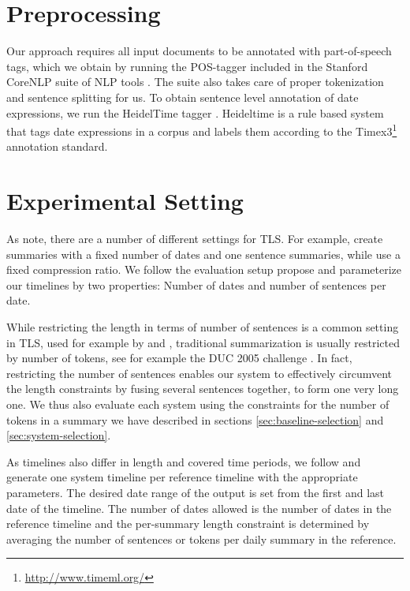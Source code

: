 \documentclass[a4paper,BCOR=10mm]{report}
\numberwithin{lemma}{chapter}
\numberwithin{definition}{chapter}
\begin{document}
\section{Preprocessing}

Our approach requires all input documents to be annotated with part-of-speech tags, which we obtain by running the POS-tagger included in the Stanford CoreNLP suite of NLP tools \citep{stanford-corenlp}. The suite also takes care of proper tokenization and sentence splitting for us.
To obtain sentence level annotation of date expressions, we run the HeidelTime tagger \citep{heideltime}. Heideltime is a rule based system that tags date expressions in a corpus and labels them according to the Timex3\footnote{\url{http://www.timeml.org/}} annotation standard.

\section{Experimental Setting} \label{sec:setup-settings}

As \citet{markert} note, there are a number of different settings for TLS.
For example, \citet{chieu} create summaries with a fixed number of dates and one sentence summaries, while \citet{yan-trans} use a fixed compression ratio.
We follow the evaluation setup \citeauthor{markert} propose and parameterize our timelines by two properties: Number of dates and number of sentences per date.

While restricting the length in terms of number of sentences is a common setting in TLS, used for example by \citet{chieu} and \citet{yan-trans}, traditional summarization is usually restricted by number of tokens, see for example the DUC 2005 challenge \citep{duc2005}. In fact, restricting the number of sentences enables our system to effectively circumvent the length constraints by fusing several sentences together, to form one very long one.
We thus also evaluate each system using the constraints for the number of tokens in a summary we have described in sections \ref{sec:baseline-selection} and \ref{sec:system-selection}.

As timelines also differ in length and covered time periods, we follow \citet{markert} and generate one system timeline per reference timeline with the appropriate parameters. The desired date range of the output is set from the first and last date of the timeline. The number of dates allowed is the number of dates in the reference timeline and the per-summary length constraint is determined by averaging the number of sentences or tokens per daily summary in the reference.
\end{document}
